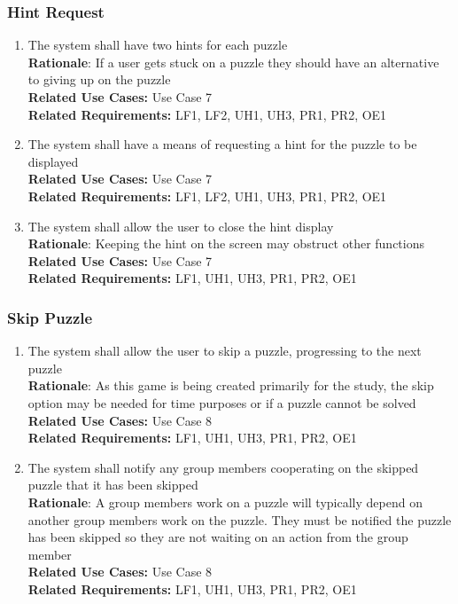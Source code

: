 \documentclass[12pt]{article}
\begin{document}
\subsubsection{Hint Request}
    \begin{enumerate}[label=HR\arabic*., series=HintRequest]
        \item The system shall have two hints for each puzzle\\
        \textbf{Rationale}: If a user gets stuck on a puzzle they should have an alternative to giving up on the puzzle\\
        \textbf{Related Use Cases:} Use Case 7\\
        \textbf{Related Requirements:} LF1, LF2, UH1, UH3, PR1, PR2, OE1
        \item The system shall have a means of requesting a hint for the puzzle to be displayed\\
        \textbf{Related Use Cases:} Use Case 7\\
        \textbf{Related Requirements:} LF1, LF2, UH1, UH3, PR1, PR2, OE1
        \item The system shall allow the user to close the hint display\\
        \textbf{Rationale}: Keeping the hint on the screen may obstruct other functions\\
        \textbf{Related Use Cases:} Use Case 7\\
        \textbf{Related Requirements:} LF1, UH1, UH3, PR1, PR2, OE1
    \end{enumerate}
\subsubsection{Skip Puzzle}
    \begin{enumerate}[label=SP\arabic*., series=SkipPuzzle]
        \item The system shall allow the user to skip a puzzle, progressing to the next puzzle\\
        \textbf{Rationale}: As this game is being created primarily for the study, the skip option may be needed for time purposes or if a puzzle cannot be solved\\
        \textbf{Related Use Cases:} Use Case 8\\
        \textbf{Related Requirements:} LF1, UH1, UH3, PR1, PR2, OE1
        \item The system shall notify any group members cooperating on the skipped puzzle that it has been skipped\\
        \textbf{Rationale}: A group members work on a puzzle will typically depend on another group members work on the puzzle. They must be notified the puzzle has been skipped so they are not waiting on an action from the group member\\
        \textbf{Related Use Cases:} Use Case 8\\
        \textbf{Related Requirements:} LF1, UH1, UH3, PR1, PR2, OE1
    \end{enumerate}
\end{document}
